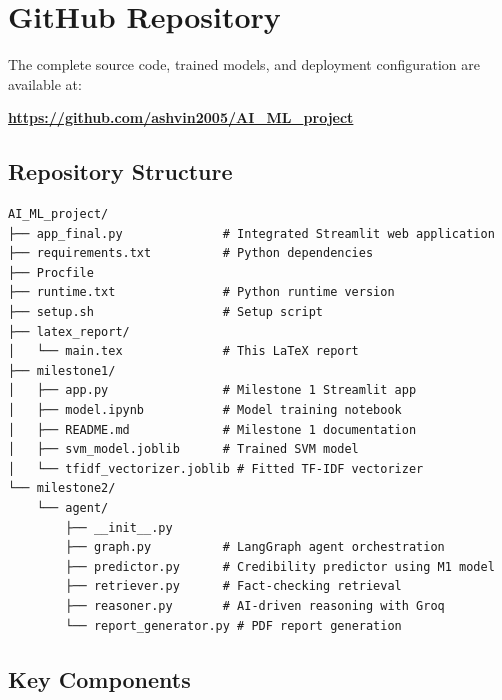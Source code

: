 \documentclass[conference]{IEEEtran}
\begin{document}
\appendix

\section{GitHub Repository}

The complete source code, trained models, and deployment configuration are available at:

\begin{center}
\textbf{\url{https://github.com/ashvin2005/AI_ML_project}}
\end{center}

\subsection{Repository Structure}

\begin{lstlisting}
AI_ML_project/
├── app_final.py              # Integrated Streamlit web application
├── requirements.txt          # Python dependencies
├── Procfile                
├── runtime.txt               # Python runtime version
├── setup.sh                  # Setup script
├── latex_report/
│   └── main.tex              # This LaTeX report
├── milestone1/
│   ├── app.py                # Milestone 1 Streamlit app
│   ├── model.ipynb           # Model training notebook
│   ├── README.md             # Milestone 1 documentation
│   ├── svm_model.joblib      # Trained SVM model
│   └── tfidf_vectorizer.joblib # Fitted TF-IDF vectorizer
└── milestone2/
    └── agent/
        ├── __init__.py
        ├── graph.py          # LangGraph agent orchestration
        ├── predictor.py      # Credibility predictor using M1 model
        ├── retriever.py      # Fact-checking retrieval
        ├── reasoner.py       # AI-driven reasoning with Groq
        └── report_generator.py # PDF report generation
\end{lstlisting}

\subsection{Key Components}
\end{document}
